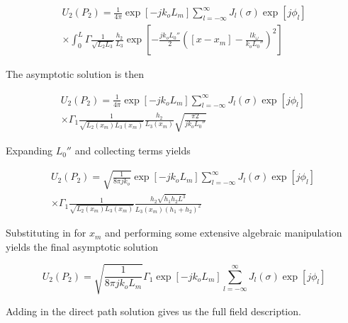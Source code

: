 \begin{equation}
\begin{gathered}
U_2(P_2) = \frac{1}{4\pi} \exp[-jk_oL_m] \sum_{l=-\infty}^{\infty}J_l(\sigma)\exp\left[j\phi_l\right] \\
\times \int_0^L  \Gamma \frac{1}{\sqrt{L_2L_3}}\frac{h_2}{L_3}\exp\left[-\frac{jk_oL_0''}{2}\left([x-x_m]-\frac{lk_{\omega}}{k_oL_0''} \right)^2\right]
\label{cyl_eq:8}
\end{gathered}
\end{equation}
\renewcommand{\baselinestretch}{2} \small\normalsize

\noindent The asymptotic solution is then

\begin{equation}
\begin{gathered}
U_2(P_2) = \frac{1}{4\pi} \exp[-jk_oL_m] \sum_{l=-\infty}^{\infty}J_l(\sigma)\exp\left[j\phi_l\right]\  \\
\times \Gamma_1 \frac{1}{\sqrt{L_2(x_m)L_3(x_m)}}\frac{h_2}{L_3(x_m)}\sqrt{\frac{\pi 2}{jk_oL_0''}}
\label{cyl_eq:9}
\end{gathered}
\end{equation}
\renewcommand{\baselinestretch}{2} \small\normalsize

\noindent Expanding $L_0''$ and collecting terms yields

\begin{equation}
\begin{gathered}
U_2(P_2) = \sqrt{\frac{1}{8\pi j k_o}} \exp[-jk_oL_m] \sum_{l=-\infty}^{\infty}J_l(\sigma)\exp\left[j\phi_l\right]\  \\
\times \Gamma_1 \frac{1}{\sqrt{L_2(x_m)L_3(x_m)}}\frac{h_2\sqrt{h_1h_2L^3}}{L_3(x_m)(h_1+h_2)^2}
\label{cyl_eq:10}
\end{gathered}
\end{equation}
\renewcommand{\baselinestretch}{2} \small\normalsize

\noindent Substituting in for $x_m$ and performing some extensive algebraic manipulation yields the final asymptotic solution

\begin{equation}
U_2(P_2) = \sqrt{\frac{1}{8\pi j k_oL_m}} \Gamma_1\exp[-jk_oL_m] \sum_{l=-\infty}^{\infty}J_l(\sigma)\exp\left[j\phi_l\right]
\label{cyl_eq:11}
\end{equation}
\renewcommand{\baselinestretch}{2} \small\normalsize

Adding in the direct path solution gives us the full field description.


